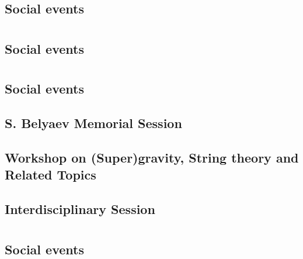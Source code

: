 \section{}
\subsection{Social events}

\clearpage

\section{}
\subsection{Social events}

\clearpage

\section{}
\subsection{Social events}

\clearpage

\subsection{S. Belyaev Memorial Session}

\clearpage

\subsection{Workshop on (Super)gravity, String theory and Related Topics}

\clearpage

\subsection{Interdisciplinary Session}

\clearpage

\section{}
\subsection{Social events}

\clearpage


